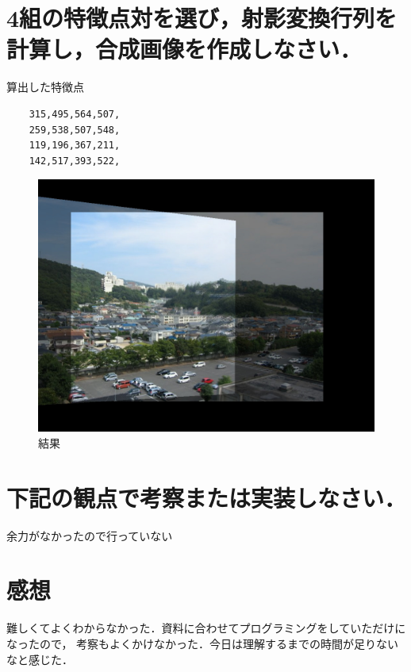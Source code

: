 \documentclass[11pt]{jarticle}
\begin{document}
\section{4組の特徴点対を選び，射影変換行列を計算し，合成画像を作成しなさい．}
算出した特徴点
\begin{verbatim}
    315,495,564,507,
    259,538,507,548,
    119,196,367,211,
    142,517,393,522,
\end{verbatim}
    \begin{figure}[ht]
        \centering
        \includegraphics[scale=.3]{dai6.jpg}
        \caption{結果}
    \end{figure}

\section{下記の観点で考察または実装しなさい．}
余力がなかったので行っていない

\section{感想}
難しくてよくわからなかった．資料に合わせてプログラミングをしていただけになったので，
考察もよくかけなかった．今日は理解するまでの時間が足りないなと感じた．
\end{document}
